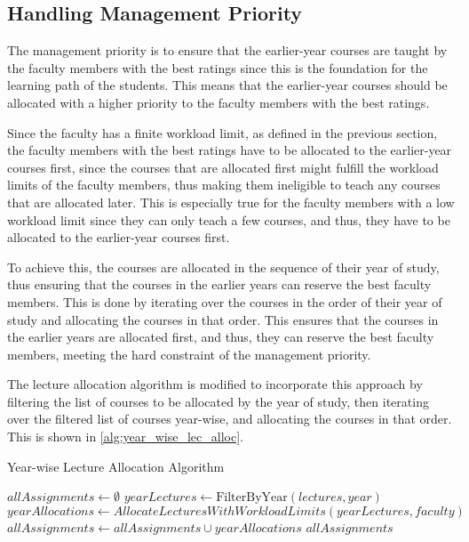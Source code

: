 \subsection{Handling Management Priority}

The management priority is to ensure that the earlier-year courses are taught by the faculty members with the best ratings since this is the foundation for the learning path of the students. This means that the earlier-year courses should be allocated with a higher priority to the faculty members with the best ratings.

Since the faculty has a finite workload limit, as defined in the previous section, the faculty members with the best ratings have to be allocated to the earlier-year courses first, since the courses that are allocated first might fulfill the workload limits of the faculty members, thus making them ineligible to teach any courses that are allocated later. This is especially true for the faculty members with a low workload limit since they can only teach a few courses, and thus, they have to be allocated to the earlier-year courses first.

To achieve this, the courses are allocated in the sequence of their year of study, thus ensuring that the courses in the earlier years can reserve the best faculty members. This is done by iterating over the courses in the order of their year of study and allocating the courses in that order. This ensures that the courses in the earlier years are allocated first, and thus, they can reserve the best faculty members, meeting the hard constraint of the management priority.

The lecture allocation algorithm is modified to incorporate this approach by filtering the list of courses to be allocated by the year of study, then iterating over the filtered list of courses year-wise, and allocating the courses in that order. This is shown in \autoref{alg:year_wise_lec_alloc}.

\begin{algorithm}[H]
  \caption{Year-wise Lecture Allocation Algorithm}
  \begin{algorithmic}[1]
    \State $allAssignments \gets \emptyset$
     
    \State $yearLectures \gets \text{FilterByYear}(lectures, year)$
    \State $yearAllocations \gets AllocateLecturesWithWorkloadLimits(yearLectures, faculty)$
    \State $allAssignments \gets allAssignments \cup yearAllocations$
    \EndFor
    \State \Return $allAssignments$
    \EndProcedure
  \end{algorithmic}
  \label{alg:year_wise_lec_alloc}
\end{algorithm}

